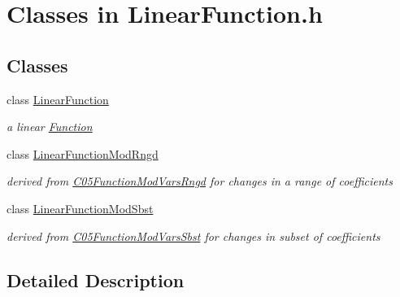 \hypertarget{group___l_fun___c_l_a_s_s_e_s}{}\section{Classes in Linear\+Function.\+h}
\label{group___l_fun___c_l_a_s_s_e_s}
\subsection*{Classes}
\begin{DoxyCompactItemize}
\item 
class \mbox{\hyperlink{class_s_m_spp__di__unipi__it_1_1_linear_function}{Linear\+Function}}
\begin{DoxyCompactList}\small\item\em a linear \mbox{\hyperlink{class_s_m_spp__di__unipi__it_1_1_function}{Function}} \end{DoxyCompactList}\item 
class \mbox{\hyperlink{class_s_m_spp__di__unipi__it_1_1_linear_function_mod_rngd}{Linear\+Function\+Mod\+Rngd}}
\begin{DoxyCompactList}\small\item\em derived from \mbox{\hyperlink{class_s_m_spp__di__unipi__it_1_1_c05_function_mod_vars_rngd}{C05\+Function\+Mod\+Vars\+Rngd}} for changes in a range of coefficients \end{DoxyCompactList}\item 
class \mbox{\hyperlink{class_s_m_spp__di__unipi__it_1_1_linear_function_mod_sbst}{Linear\+Function\+Mod\+Sbst}}
\begin{DoxyCompactList}\small\item\em derived from \mbox{\hyperlink{class_s_m_spp__di__unipi__it_1_1_c05_function_mod_vars_sbst}{C05\+Function\+Mod\+Vars\+Sbst}} for changes in subset of coefficients \end{DoxyCompactList}\end{DoxyCompactItemize}


\subsection{Detailed Description}
